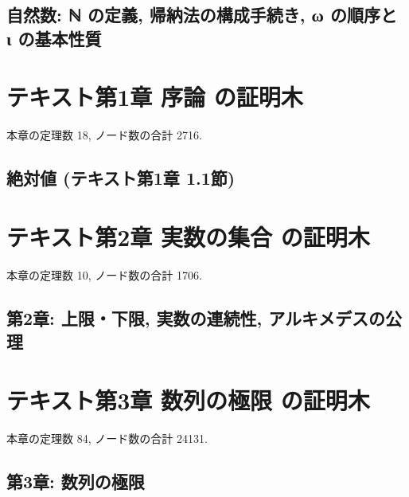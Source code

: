 \section{自然数: ℕ の定義, 帰納法の構成手続き, ω の順序と ι の基本性質}












\chapter{テキスト第1章 序論 の証明木}
本章の定理数 18, ノード数の合計 2716.

\section{絶対値 (テキスト第1章 1.1節)}


















\chapter{テキスト第2章 実数の集合 の証明木}
本章の定理数 10, ノード数の合計 1706.

\section{第2章: 上限・下限, 実数の連続性, アルキメデスの公理}










\chapter{テキスト第3章 数列の極限 の証明木}
本章の定理数 84, ノード数の合計 24131.

\section{第3章: 数列の極限}


















